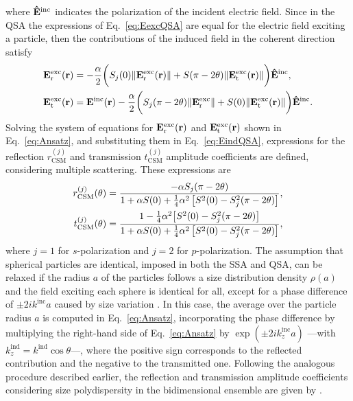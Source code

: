 %
where $\vu{E}^\text{inc}$ indicates the polarization of the incident electric field. Since in the QSA the expressions of Eq.~\eqref{eq:EexcQSA} are equal for the electric field exciting a particle, then the contributions of the induced field in the coherent direction satisfy \cite{garcia2012multiple}
%
\begin{subequations}%
	\begin{align}%
		\vb{E}^\text{exc}_\text{r}(\vb{r}) &= -\frac{\alpha}{2} \bigg( S_j(0) \norm{\vb{E}^\text{exc}_\text{r}(\vb{r})} +  S(\pi-2\theta)\norm{\vb{E}^\text{exc}_\text{t}(\vb{r})}\bigg) \vu{E}^\text{inc},\\
		\vb{E}^\text{exc}_\text{t}(\vb{r}) &= \vb{E}^\text{inc}(\vb{r}) -\frac{\alpha}{2} \bigg( S_j(\pi-2\theta) \norm{\vb{E}^\text{exc}_\text{r}} + S(0)\norm{\vb{E}^\text{exc}_\text{t}(\vb{r})} \bigg)
		\vu{E}^\text{inc}.
	\end{align}%
	\label{eq:Ansatz}%
\end{subequations}%
%
Solving the system of equations for $\vb{E}^\text{exc}_\text{r}(\vb{r})$ and $\vb{E}^\text{exc}_\text{t}(\vb{r})$ shown in Eq.~\eqref{eq:Ansatz}, and substituting them in Eq.~\eqref{eq:EindQSA}, expressions for the reflection $r^{(j)}_\text{CSM}$ and transmission $t^{(j)}_\text{CSM}$ amplitude coefficients are defined, considering multiple scattering. These expressions are \cite{garcia2012multiple,barrera_coherent_2003}
%
\begin{subequations}%
	\begin{align}
		r^{(j)}_\text{CSM}(\theta)&=\frac{-\alpha S_j(\pi-2\theta)}
		{1+\alpha S(0)+\frac14 \alpha^2 \left[S^2(0)-S_j^2 (\pi-2\theta) \right]},\\
		t^{(j)}_\text{CSM}(\theta)&=\frac{1-\frac14\alpha^2\qty[S^2(0)-S_j^2(\pi-2\theta)]}
		{1+\alpha S(0)+\frac14 \alpha^2 \left[S^2(0)-S_j^2 (\pi-2\theta) \right]},
	\end{align}%
	\label{eq:CSMmono}%
\end{subequations}%
%
where $j=1$ for $s$-polarization and $j=2$ for $p$-polarization. The assumption that spherical particles are identical, imposed in both the SSA and QSA, can be relaxed if the radius $a$ of the particles follows a size distribution density $\rho(a)$ and the field exciting each sphere is identical for all, except for a phase difference of $\pm2ik^\text{inc}a$ caused by size variation \cite{vazquez-estrada_optical_2014}. In this case, the average over the particle radius $a$ is computed in Eq.~\eqref{eq:Ansatz}, incorporating the phase difference by multiplying the right-hand side of Eq.~\eqref{eq:Ansatz} by $\exp(\pm2ik_z^\text{inc} a)$ ---with $k_z^\text{ind} = k^\text{ind}\cos\theta$---, where the positive sign corresponds to the reflected contribution and the negative to the transmitted one. Following the analogous procedure described earlier, the reflection and transmission amplitude coefficients considering size polydispersity in the bidimensional ensemble are given by \cite{vazquez-estrada_optical_2014}.
